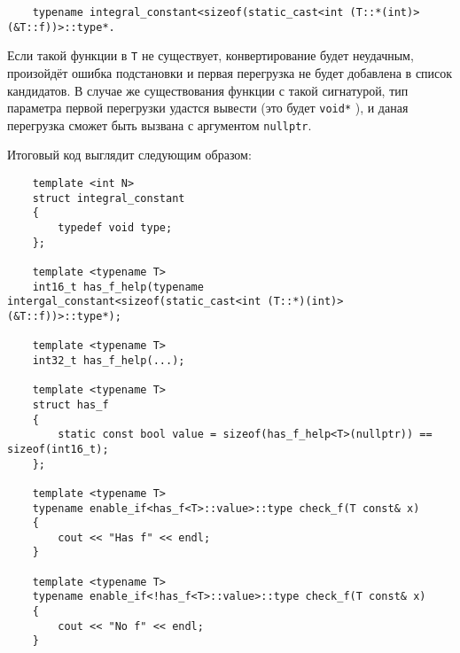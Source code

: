 	\begin{verbatim}
	typename integral_constant<sizeof(static_cast<int (T::*(int)>(&T::f))>::type*. 
	\end{verbatim}
	
	Если такой функции в \texttt{T} не существует, конвертирование будет неудачным, произойдёт ошибка подстановки и первая перегрузка не будет добавлена в список кандидатов. В случае же существования функции с такой сигнатурой, тип параметра первой перегрузки удастся вывести (это будет \texttt{void*} ), и даная перегрузка сможет быть вызвана с аргументом \texttt{nullptr}.
	
	Итоговый код выглядит следующим образом:
	
	\begin{verbatim}
	template <int N>
	struct integral_constant
	{
	    typedef void type;
	};

	template <typename T>
	int16_t has_f_help(typename intergal_constant<sizeof(static_cast<int (T::*)(int)>(&T::f))>::type*);

	template <typename T>
	int32_t has_f_help(...);

	template <typename T>
	struct has_f
	{
	    static const bool value = sizeof(has_f_help<T>(nullptr)) == sizeof(int16_t);
	};

	template <typename T>
	typename enable_if<has_f<T>::value>::type check_f(T const& x)
	{
	    cout << "Has f" << endl;
	}

	template <typename T>
	typename enable_if<!has_f<T>::value>::type check_f(T const& x)
	{
	    cout << "No f" << endl;
	}
	\end{verbatim}
	
